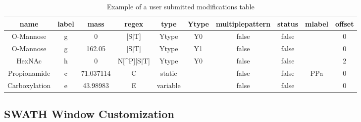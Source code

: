 \documentclass[..\manual.tex]{subfiles}
\begin{document}
\begin{table}
	\caption{Example of a user submitted modifications table}
	\begin{adjustbox}{width=1\textwidth}
		\small
		\begin{tabular}{c c c c c c c c c c}
			\hline name & label & mass & regex & type & Ytype & multiplepattern & status & mlabel & offset \\ [0.1ex]
			\hline\hline
			O-Mannose & g & 0 & [S$|$T] & Ytype & Y0 & false & false & & 0 \\
			O-Mannose & g & 162.05 & [S$|$T] & Ytype &  Y1 & false & false & & 0 \\
			HexNAc & h & 0 & N[\^{}P][S$|$T] & Ytype &  Y0 & false & false & & 2 \\
			Propionamide & c & 71.037114 & C & static &  & false & false & PPa & 0 \\
			Carboxylation & e & 43.98983 & E & variable &  & false & false &  & 0 \\
		\end{tabular}
	\end{adjustbox}
\end{table}

\subsection{SWATH Window Customization}
\end{document}

